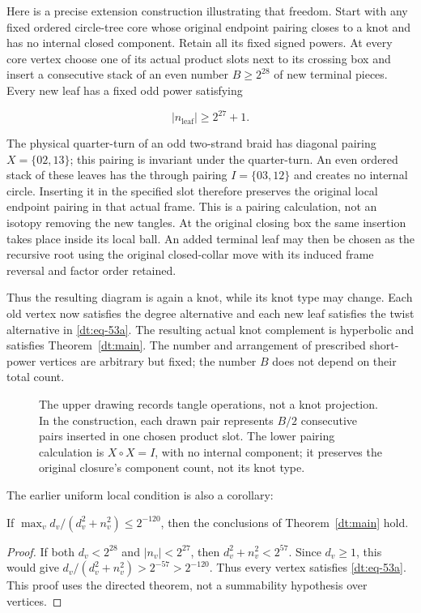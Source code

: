 Here is a precise extension construction illustrating that freedom.
Start with any fixed ordered circle-tree core whose original endpoint
pairing closes to a knot and has no internal closed component. Retain
all its fixed signed powers. At every core vertex choose one of its
actual product slots next to its crossing box and insert a consecutive
stack of an even number \(B\ge2^{28}\) of new terminal pieces. Every
new leaf has a fixed odd power satisfying

\begin{equation}\label{dt:eq-53c}
|n_{\mathrm{leaf}}|\ge2^{27}+1.
\end{equation}

The physical quarter-turn of an odd two-strand braid has diagonal
pairing \(X=\{02,13\}\); this pairing is invariant under the
quarter-turn. An even ordered stack of these leaves has the through
pairing \(I=\{03,12\}\) and creates no internal circle. Inserting it
in the specified slot therefore preserves the original local endpoint
pairing in that actual frame. This is a pairing calculation, not an
isotopy removing the new tangles. At the original closing box the same
insertion takes place inside its local ball. An added terminal leaf may
then be chosen as the recursive root using the original closed-collar
move with its induced frame reversal and factor order retained.

Thus the resulting diagram is again a knot, while its knot type may
change. Each old vertex now satisfies the degree alternative and each
new leaf satisfies the twist alternative in \eqref{dt:eq-53a}. The resulting actual
knot complement is hyperbolic and satisfies Theorem~\ref{dt:main}. The number and
arrangement of prescribed short-power vertices are arbitrary but fixed;
the number \(B\) does not depend on their total count.

\begin{figure}[t]
\centering
\caption{The upper drawing records tangle operations, not a knot
projection. In the construction, each drawn pair represents \(B/2\)
consecutive pairs inserted in one chosen product slot. The lower
pairing calculation is \(X\circ X=I\), with no internal component;
it preserves the original closure's component count, not its knot type.}
\label{dt:leaves-figure}
\end{figure}

The earlier uniform local condition is also a corollary:
\begin{corollary}\label{dt:local}
If \(\max_v d_v/(d_v^2+n_v^2)\le2^{-120}\), then the conclusions
of Theorem~\ref{dt:main} hold.
\end{corollary}
\begin{proof}
If both \(d_v<2^{28}\) and \(|n_v|<2^{27}\), then
\(d_v^2+n_v^2<2^{57}\). Since \(d_v\ge1\), this would give
\(d_v/(d_v^2+n_v^2)>2^{-57}>2^{-120}\). Thus every vertex
satisfies \eqref{dt:eq-53a}. This proof uses the directed theorem,
not a summability hypothesis over vertices.
\end{proof}

